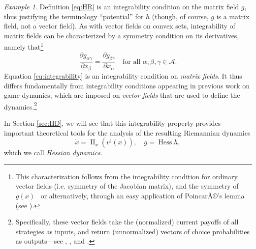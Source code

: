 \documentclass[reqno]{amsart}
\theoremstyle{plain}
\theoremstyle{definition}
\theoremstyle{remark}
\newtheorem{example}[theorem]{Example}
\numberwithin{equation}{section}
\numberwithin{theorem}{section}
\begin{document}
\begin{example}
Definition \eqref{eq:HR} is an integrability condition on the matrix field $g$, thus justifying the terminology ``potential'' for $h$ (though, of course, $g$ is a matrix field, not a vector field).
As with vector fields on convex sets, integrability of matrix fields can be characterized by a symmetry condition on its derivatives, namely that\footnote{This characterization follows from the integrability condition for ordinary vector fields (i.e. symmetry of the Jacobian matrix), and the symmetry of $g(x)$ \textendash\ or alternatively, through an easy application of PoincarÃ©'s lemma (see \cite{ABB04}).} 
\begin{equation}
\label{eq:integrability}
\frac{\partial g_{\alpha\gamma}}{\partial x_\beta}
	=\frac{\partial g_{\beta\gamma}}{\partial x_\alpha}
	\quad
	\text{for all $\alpha,\beta,\gamma\in{\mathcal{A}}$}.
\end{equation}
Equation \eqref{eq:integrability} is an integrability condition on \emph{matrix fields}.  It thus differs fundamentally from integrability conditions appearing in previous work on game dynamics, which are imposed on \emph{vector fields} that are used to define the dynamics.\footnote{Specifically, these vector fields take the (normalized) current payoffs of all strategies as inputs, and return (unnormalized) vectors of choice probabilities as outputs---see \cite{HMC01b}, \cite{HS09}, and \cite{San10c, San14}.}

In Section \ref{sec:HD}, we will see that this integrability property provides important theoretical tools for the analysis of the resulting Riemannian dynamics
\begin{equation}
\label{eq:HD}
\tag{HD}
\dot x
	= \operatorname{\Pi}_{x}({v}^{\sharp}(x)),
	\quad
	g
	= \operatorname{Hess} h,
\end{equation}
which we call \emph{Hessian dynamics}.
\end{example}
\end{document}
